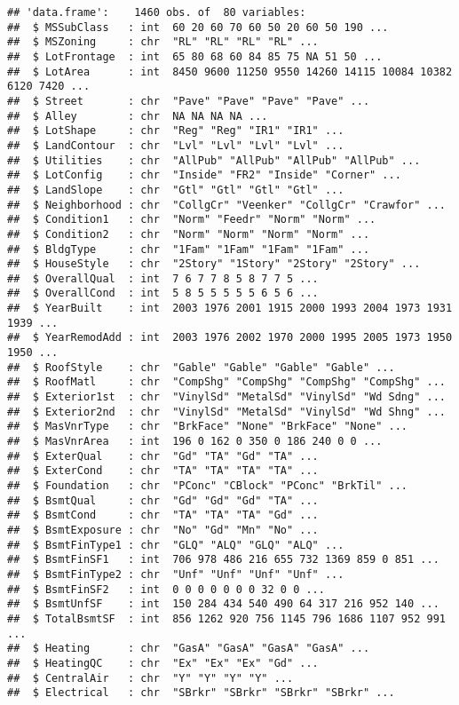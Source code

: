\documentclass[
]{article}
\begin{document}
\begin{verbatim}
## 'data.frame':    1460 obs. of  80 variables:
##  $ MSSubClass   : int  60 20 60 70 60 50 20 60 50 190 ...
##  $ MSZoning     : chr  "RL" "RL" "RL" "RL" ...
##  $ LotFrontage  : int  65 80 68 60 84 85 75 NA 51 50 ...
##  $ LotArea      : int  8450 9600 11250 9550 14260 14115 10084 10382 6120 7420 ...
##  $ Street       : chr  "Pave" "Pave" "Pave" "Pave" ...
##  $ Alley        : chr  NA NA NA NA ...
##  $ LotShape     : chr  "Reg" "Reg" "IR1" "IR1" ...
##  $ LandContour  : chr  "Lvl" "Lvl" "Lvl" "Lvl" ...
##  $ Utilities    : chr  "AllPub" "AllPub" "AllPub" "AllPub" ...
##  $ LotConfig    : chr  "Inside" "FR2" "Inside" "Corner" ...
##  $ LandSlope    : chr  "Gtl" "Gtl" "Gtl" "Gtl" ...
##  $ Neighborhood : chr  "CollgCr" "Veenker" "CollgCr" "Crawfor" ...
##  $ Condition1   : chr  "Norm" "Feedr" "Norm" "Norm" ...
##  $ Condition2   : chr  "Norm" "Norm" "Norm" "Norm" ...
##  $ BldgType     : chr  "1Fam" "1Fam" "1Fam" "1Fam" ...
##  $ HouseStyle   : chr  "2Story" "1Story" "2Story" "2Story" ...
##  $ OverallQual  : int  7 6 7 7 8 5 8 7 7 5 ...
##  $ OverallCond  : int  5 8 5 5 5 5 5 6 5 6 ...
##  $ YearBuilt    : int  2003 1976 2001 1915 2000 1993 2004 1973 1931 1939 ...
##  $ YearRemodAdd : int  2003 1976 2002 1970 2000 1995 2005 1973 1950 1950 ...
##  $ RoofStyle    : chr  "Gable" "Gable" "Gable" "Gable" ...
##  $ RoofMatl     : chr  "CompShg" "CompShg" "CompShg" "CompShg" ...
##  $ Exterior1st  : chr  "VinylSd" "MetalSd" "VinylSd" "Wd Sdng" ...
##  $ Exterior2nd  : chr  "VinylSd" "MetalSd" "VinylSd" "Wd Shng" ...
##  $ MasVnrType   : chr  "BrkFace" "None" "BrkFace" "None" ...
##  $ MasVnrArea   : int  196 0 162 0 350 0 186 240 0 0 ...
##  $ ExterQual    : chr  "Gd" "TA" "Gd" "TA" ...
##  $ ExterCond    : chr  "TA" "TA" "TA" "TA" ...
##  $ Foundation   : chr  "PConc" "CBlock" "PConc" "BrkTil" ...
##  $ BsmtQual     : chr  "Gd" "Gd" "Gd" "TA" ...
##  $ BsmtCond     : chr  "TA" "TA" "TA" "Gd" ...
##  $ BsmtExposure : chr  "No" "Gd" "Mn" "No" ...
##  $ BsmtFinType1 : chr  "GLQ" "ALQ" "GLQ" "ALQ" ...
##  $ BsmtFinSF1   : int  706 978 486 216 655 732 1369 859 0 851 ...
##  $ BsmtFinType2 : chr  "Unf" "Unf" "Unf" "Unf" ...
##  $ BsmtFinSF2   : int  0 0 0 0 0 0 0 32 0 0 ...
##  $ BsmtUnfSF    : int  150 284 434 540 490 64 317 216 952 140 ...
##  $ TotalBsmtSF  : int  856 1262 920 756 1145 796 1686 1107 952 991 ...
##  $ Heating      : chr  "GasA" "GasA" "GasA" "GasA" ...
##  $ HeatingQC    : chr  "Ex" "Ex" "Ex" "Gd" ...
##  $ CentralAir   : chr  "Y" "Y" "Y" "Y" ...
##  $ Electrical   : chr  "SBrkr" "SBrkr" "SBrkr" "SBrkr" ...

\end{verbatim}
\end{document}

